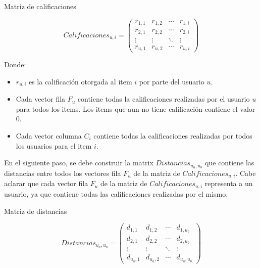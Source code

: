 \documentclass[11pt,a4paper,twoside]{thesis}
\begin{document}
\begin{description}
	\item[Matriz de calificaciones]
\end{description}
\begin{equation*}
	Calificaciones_{u,i} =
	\begin{pmatrix}
	r_{1,1} & r_{1,2} & \cdots & r_{1,i} \\
	r_{2,1} & r_{2,2} & \cdots & r_{2,i} \\
	\vdots  & \vdots  & \ddots & \vdots  \\
	r_{u,1} & r_{u,2} & \cdots & r_{u,i}
	\end{pmatrix}
\end{equation*}

\begin{description}
	\item[Donde:]
\end{description}
\begin{itemize}
	\item $r_{u,i}$ es la calificación otorgada al item $i$ por parte del usuario $u$.
	\item Cada vector fila $F_u$ contiene todas la calificaciones realizadas por el usuario $u$ para todos los items. Los items que aun no tiene calificación contiene el valor 0.
	\item Cada vector columna $C_i$ contiene todas la calificaciones realizadas por todos los usuarios para el item $i$.
\end{itemize}


En el siguiente paso, se debe construir la matrix $Distancias_{u_a,u_b}$ que contiene las distancias entre todos los vectores fila $F_u$ de la matriz de $Calificaciones_{u,i}$.
Cabe aclarar que cada vector fila $F_u$ de la matriz de $Calificaciones_{u,i}$ representa a un usuario, ya que contiene todas las calificaciones realizadas por el mismo.


\clearpage
\begin{description}
	\item[Matriz de distancias]
\end{description}
\begin{equation*}
	Distancias_{u_a,u_b} =
	\begin{pmatrix}
	d_{1,1} & d_{1,2} & \cdots & d_{1,u_b} \\
	d_{2,1} & d_{2,2} & \cdots & d_{2,u_b} \\
	\vdots  & \vdots  & \ddots & \vdots  \\
	d_{u_a,1} & d_{u_a,2} & \cdots & d_{u_a,u_b} 
	\end{pmatrix}
\end{equation*}
\end{document}
